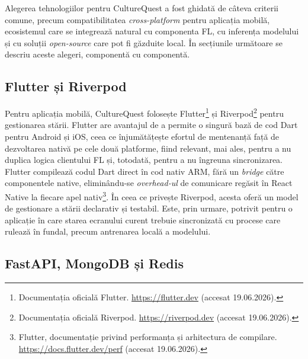 \documentclass[12pt,a4paper]{report}
\begin{document}
Alegerea tehnologiilor pentru CultureQuest a fost ghidată de câteva criterii comune, precum compatibilitatea \textit{cross-platform} pentru aplicația mobilă, ecosistemul care se integrează natural cu componenta FL, cu inferența modelului și cu soluții \textit{open-source} care pot fi găzduite local. În secțiunile următoare se descriu aceste alegeri, componentă cu componentă.

\subsection{Flutter și Riverpod}

Pentru aplicația mobilă, CultureQuest folosește Flutter\footnote{Documentația oficială Flutter. \url{https://flutter.dev} (accesat 19.06.2026).} și Riverpod\footnote{Documentația oficială Riverpod. \url{https://riverpod.dev} (accesat 19.06.2026).} pentru gestionarea stării. Flutter are avantajul de a permite o singură bază de cod Dart pentru Android și iOS, ceea ce înjumătățește efortul de mentenanță față de dezvoltarea nativă pe cele două platforme, fiind relevant, mai ales, pentru a nu duplica logica clientului FL și, totodată, pentru a nu îngreuna sincronizarea. Flutter compilează codul Dart direct în cod nativ ARM, fără un \textit{bridge} către componentele native, eliminându-se \textit{overhead-ul} de comunicare regăsit în React Native la fiecare apel nativ\footnote{Flutter, documentație privind performanța și arhitectura de compilare. \url{https://docs.flutter.dev/perf} (accesat 19.06.2026).}. În ceea ce privește Riverpod, acesta oferă un model de gestionare a stării declarativ și testabil. Este, prin urmare, potrivit pentru o aplicație în care starea ecranului curent trebuie sincronizată cu procese care rulează în fundal, precum antrenarea locală a modelului.

\subsection{FastAPI, MongoDB și Redis}
\end{document}
